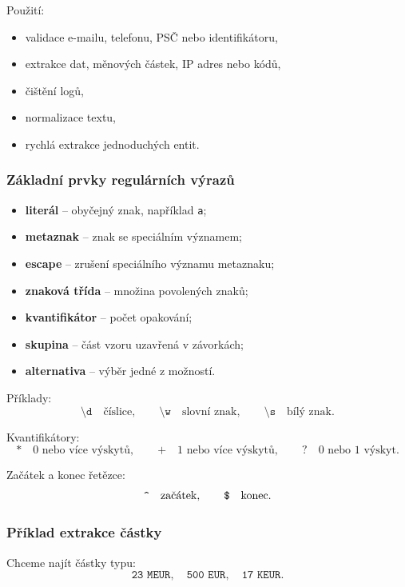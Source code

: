 Použití:
\begin{itemize}
    \item validace e-mailu, telefonu, PSČ nebo identifikátoru,
    \item extrakce dat, měnových částek, IP adres nebo kódů,
    \item čištění logů,
    \item normalizace textu,
    \item rychlá extrakce jednoduchých entit.
\end{itemize}

\subsubsection{Základní prvky regulárních výrazů}

\begin{itemize}
    \item \textbf{literál} -- obyčejný znak, například \texttt{a};
    \item \textbf{metaznak} -- znak se speciálním významem;
    \item \textbf{escape} -- zrušení speciálního významu metaznaku;
    \item \textbf{znaková třída} -- množina povolených znaků;
    \item \textbf{kvantifikátor} -- počet opakování;
    \item \textbf{skupina} -- část vzoru uzavřená v závorkách;
    \item \textbf{alternativa} -- výběr jedné z možností.
\end{itemize}

Příklady:
\[
\texttt{\textbackslash d}
\quad
\text{číslice},
\qquad
\texttt{\textbackslash w}
\quad
\text{slovní znak},
\qquad
\texttt{\textbackslash s}
\quad
\text{bílý znak}.
\]

Kvantifikátory:
\[
\texttt{*}
\quad
\text{0 nebo více výskytů},
\qquad
\texttt{+}
\quad
\text{1 nebo více výskytů},
\qquad
\texttt{?}
\quad
\text{0 nebo 1 výskyt}.
\]

Začátek a konec řetězce:
\[
\texttt{\string^}
\quad
\text{začátek},
\qquad
\texttt{\$}
\quad
\text{konec}.
\]

\subsubsection{Příklad extrakce částky}

Chceme najít částky typu:
\[
\texttt{23 MEUR},\quad \texttt{500 EUR},\quad \texttt{17 KEUR}.
\]

